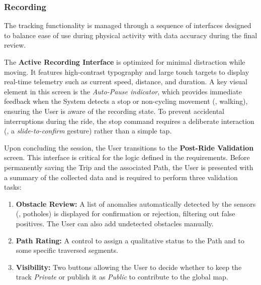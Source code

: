 \subsubsection*{Recording}
\begin{minipage}[t]{0.45\textwidth}
    \setlength{\parindent}{7mm}
    \setlength{\parskip}{2mm}
    \vspace{0pt}
    \noindent
    The tracking functionality is managed through a sequence of interfaces designed to balance ease of use during physical activity with data accuracy during the final review.
    
    The \textbf{Active Recording Interface} is optimized for minimal distraction while moving. It features high-contrast typography and large touch targets to display real-time telemetry such as current speed, distance, and duration. A key visual element in this screen is the \emph{Auto-Pause indicator}, which provides immediate feedback when the System detects a stop or non-cycling movement (\eg, walking), ensuring the User is aware of the recording state. To prevent accidental interruptions during the ride, the stop command requires a deliberate interaction (\eg, a \emph{slide-to-confirm} gesture) rather than a simple tap.

    Upon concluding the session, the User transitions to the \textbf{Post-Ride Validation} screen. This interface is critical for the logic defined in the requirements. Before permanently saving the Trip and the associated Path, the User is presented with a summary of the collected data and is required to perform three validation tasks:
    \begin{enumerate}[noitemsep]
        \item \textbf{Obstacle Review:} A list of anomalies automatically detected by the sensors (\eg, potholes) is displayed for confirmation or rejection, filtering out false positives. The User can also add undetected obstacles manually.
        \item \textbf{Path Rating:} A control to assign a qualitative status to the Path and to some specific traversed segments.
        \item \textbf{Visibility:} Two buttons allowing the User to decide whether to keep the track \emph{Private} or publish it as \emph{Public} to contribute to the global map.
    \end{enumerate}
\end{minipage}
\hfill
